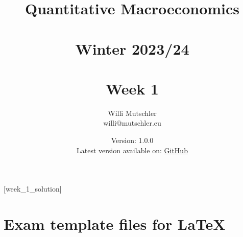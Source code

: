 
\newif\ifDisplaySolutions%


\title{Quantitative Macroeconomics\\~\\Winter 2023/24\\~\\Week 1}
\author{Willi Mutschler\\willi@mutschler.eu}
\date{Version: 1.0.0\\Latest version available on: \href{https://github.com/wmutschl/Quantitative-Macroeconomics/releases/latest/download/week_1.pdf}{GitHub}}
\maketitle\thispagestyle{empty}

\newpage
{}[week_1_solution]
\tableofcontents\thispagestyle{empty}\newpage

\setcounter{page}{1}
\newpage
\newpage
\newpage
\newpage
\printbibliography
\newpage
\appendix
\section{Exam template files for \LaTeX}




\ifDisplaySolutions
\newpage
\section{Solutions}

\fi
